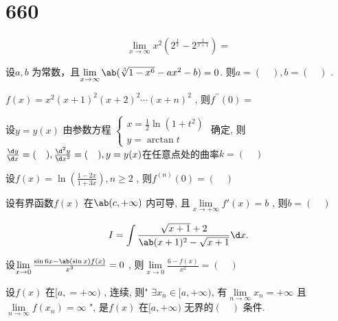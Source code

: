 \section{660}

\begin{question}
    \begin{equation*}
        \lim\limits_{x \to \infty} x^2 (2^{\frac{1}{x}} - 2^{\frac{1}{x + 1}}) = 
    \end{equation*}
\end{question}

\begin{question}
    设$ a, b $ 为常数，且$ \lim\limits_{x \to \infty} \ab(\sqrt[3]{1 - x^6} - ax^2 - b) = 0 $. 则$ a = (\quad), b = (\quad) $ . 
\end{question}

\begin{question}
    $ f(x) = x^2 (x + 1)^2 (x + 2)^2 \cdots (x + n)^2 $ , 则$ f^{\prime \prime}(0) =  $ 
\end{question}

\begin{question}
    设$ y = y(x) $ 由参数方程  $ 
    \begin{cases}
         x = \frac 1 2 \ln(1 + t^2)      \\
         y = \arctan t  
    \end{cases} $ 
    确定, 则$ \frac{\d y}{\d x} = (\quad) , \frac{\d^2 y}{\d x^2} = (\quad) , y = y(x) $在任意点处的曲率$ k = (\quad) $  
\end{question}

\begin{question}
    设$ f(x) = \ln(\frac{1 - 2x}{1 + 3x}), n \ge 2 $ , 则$ f^{(n)} (0) = (\quad) $ 
\end{question}

\begin{question}
    设有界函数$ f(x) $ 在$ \ab(c, +\infty) $ 内可导, 且$ \lim\limits_{x \to +\infty} f\prime(x) = b $ , 则$ b = (\quad) $ 
\end{question}

\begin{question}
    \begin{equation*}
        I = \int \frac{ \sqrt{x + 1} + 2 }{\ab(x + 1)^2 - \sqrt{x + 1}} \d x.
    \end{equation*}
\end{question}

\begin{question}
    设$ \lim\limits_{x \to 0} \frac{ \sin 6x - \ab(\sin x) f(x) }{ x^3 } = 0 $ , 则$ \lim\limits_{x \to 0} \frac{6 - f(x)}{x^2} = (\quad) $ 
\end{question}

\begin{question}
    设$ f(x) $ 在$ [a, = +\infty) $ , 连续, 则" $ \exists x_n \in [a, +\infty) $, 有$ \lim\limits_{n \to \infty} x_n = +\infty $ 且$ \lim\limits_{n \to \infty} f(x_n) = \infty $ ", 是$ f(x) $ 在$ [a, +\infty) $ 无界的$ (\quad) $ 条件.
\end{question}